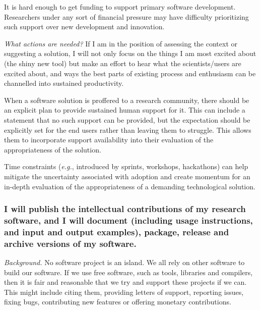 \documentclass[a4paper,UKenglish]{dagman}
\renewcommand{\paragraph}[1]{\subsubsection*{#1}\xspace}
\newcommand{\eg}{\emph{e.g.},\xspace}
\begin{document}
It is hard enough to get funding to support primary software development. Researchers under any sort of financial pressure may have difficulty prioritizing such support over new development and innovation. 

\emph{What actions are needed?}
If I am in the position of assessing the context or suggesting a solution, I will not only focus on the things I am most excited about (the shiny new tool) but make an effort to hear what the scientists/users are excited about, and ways the best parts of existing process and enthusiasm can be channelled into sustained productivity.

When a software solution is proffered to a research community, there should be an explicit plan to provide sustained human support for it. This can include a statement that no such support can be provided, but the expectation should be explicitly set for the end users rather than leaving them to struggle. This allows them to incorporate support availability into their evaluation of the appropriateness of the solution. 


Time constraints (\eg introduced by sprints, workshops, hackathons) can help mitigate the uncertainty associated with adoption and create momentum for an in-depth evaluation of the appropriateness of a demanding technological solution.

\paragraph{I will publish the intellectual contributions of my research software, and I will document (including usage instructions, and input and output examples), package, release and archive versions of my software.}

\emph{Background.}
No software project is an island. We all rely on other software to build our software. If we use free software, such as tools, libraries and compilers, then it is fair and reasonable that we try and support these projects if we can. This might include citing them, providing letters of support, reporting issues, fixing bugs, contributing new features or offering monetary contributions.
\end{document}
